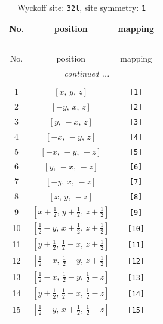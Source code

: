 \documentclass[fleqn,8pt]{jsarticle}
\begin{document}
\renewcommand{\arraystretch}{1.2}
\begin{longtable}{ccc}
\caption{Wyckoff site: {\tt 32l}, site symmetry: {\tt 1}}
 \\
 \hline \hline
No. & position & mapping \\ \hline \endfirsthead

\multicolumn{2}{l}{\tablename\ \thetable{}} \\
 \hline \hline
No. & position & mapping \\ \hline \endhead

 \hline \hline
\multicolumn{2}{r}{\footnotesize\it continued ...} \\ \endfoot

 \hline \hline
\multicolumn{2}{r}{} \\ \endlastfoot

1 & $\left[ x,\, y,\, z \right]$ & {\tt [1]} \\ \hline
2 & $\left[ - y,\, x,\, z \right]$ & {\tt [2]} \\ \hline
3 & $\left[ y,\, - x,\, z \right]$ & {\tt [3]} \\ \hline
4 & $\left[ - x,\, - y,\, z \right]$ & {\tt [4]} \\ \hline
5 & $\left[ - x,\, - y,\, - z \right]$ & {\tt [5]} \\ \hline
6 & $\left[ y,\, - x,\, - z \right]$ & {\tt [6]} \\ \hline
7 & $\left[ - y,\, x,\, - z \right]$ & {\tt [7]} \\ \hline
8 & $\left[ x,\, y,\, - z \right]$ & {\tt [8]} \\ \hline
9 & $\left[ x + \frac{1}{2},\, y + \frac{1}{2},\, z + \frac{1}{2} \right]$ & {\tt [9]} \\ \hline
10 & $\left[ \frac{1}{2} - y,\, x + \frac{1}{2},\, z + \frac{1}{2} \right]$ & {\tt [10]} \\ \hline
11 & $\left[ y + \frac{1}{2},\, \frac{1}{2} - x,\, z + \frac{1}{2} \right]$ & {\tt [11]} \\ \hline
12 & $\left[ \frac{1}{2} - x,\, \frac{1}{2} - y,\, z + \frac{1}{2} \right]$ & {\tt [12]} \\ \hline
13 & $\left[ \frac{1}{2} - x,\, \frac{1}{2} - y,\, \frac{1}{2} - z \right]$ & {\tt [13]} \\ \hline
14 & $\left[ y + \frac{1}{2},\, \frac{1}{2} - x,\, \frac{1}{2} - z \right]$ & {\tt [14]} \\ \hline
15 & $\left[ \frac{1}{2} - y,\, x + \frac{1}{2},\, \frac{1}{2} - z \right]$ & {\tt [15]} \\ \hline

\end{longtable}
\end{document}
